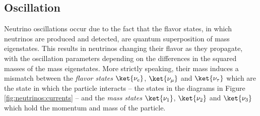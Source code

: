 \documentclass[../main.tex]{subfiles}
\begin{document}



\subsection{Oscillation}
\label{sec:th:osc}

Neutrino oscillations occur due to the fact that the flavor states, in which neutrinos are produced and detected, are quantum superposition of mass eigenstates. This results in neutrinos changing their flavor as they propagate, with the oscillation parameters depending on the differences in the squared masses of the mass eigenstates. More strictly speaking, their mass induces a mismatch between the \textit{flavor states} $\ket{\nu_e}$, $\ket{\nu_\mu}$ and $\ket{\nu_\tau}$ which are the state in which the particle interacts -- the states in the diagrams in Figure \ref{fig:neutrinos:currents} -- and the \textit{mass states} $\ket{\nu_1}$, $\ket{\nu_2}$ and $\ket{\nu_3}$ which hold the momentum and mass of the particle.
\end{document}
